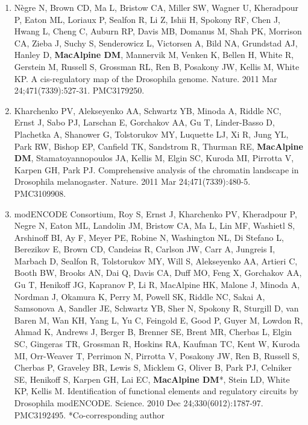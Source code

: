 \documentclass{update_nihbiosketch}
\begin{document}
\begin{enumerate}
\begin{enumerate}
\item Nègre N, Brown CD, Ma L, Bristow CA, Miller SW, Wagner U, Kheradpour P, Eaton ML, Loriaux P, Sealfon R, Li Z, Ishii H, Spokony RF, Chen J, Hwang L, Cheng C, Auburn RP, Davis MB, Domanus M, Shah PK, Morrison CA, Zieba J, Suchy S, Senderowicz L, Victorsen A, Bild NA, Grundstad AJ, Hanley D, \textbf{MacAlpine DM}, Mannervik M, Venken K, Bellen H, White R, Gerstein M, Russell S, Grossman RL, Ren B, Posakony JW, Kellis M, White KP. A cis-regulatory map of the Drosophila genome. Nature. 2011 Mar 24;471(7339):527-31. PMC3179250.

\item Kharchenko PV, Alekseyenko AA, Schwartz YB, Minoda A, Riddle NC, Ernst J, Sabo PJ, Larschan E, Gorchakov AA, Gu T, Linder-Basso D, Plachetka A, Shanower G, Tolstorukov MY, Luquette LJ, Xi R, Jung YL, Park RW, Bishop EP, Canfield TK, Sandstrom R, Thurman RE, \textbf{MacAlpine DM}, Stamatoyannopoulos JA, Kellis M, Elgin SC, Kuroda MI, Pirrotta V, Karpen GH, Park PJ. Comprehensive analysis of the chromatin landscape in Drosophila melanogaster. Nature. 2011 Mar 24;471(7339):480-5. PMC3109908.

\item modENCODE Consortium, Roy S, Ernst J, Kharchenko PV, Kheradpour P, Negre N, Eaton ML, Landolin JM, Bristow CA, Ma L, Lin MF, Washietl S, Arshinoff BI, Ay F, Meyer PE, Robine N, Washington NL, Di Stefano L, Berezikov E, Brown CD, Candeias R, Carlson JW, Carr A, Jungreis I, Marbach D, Sealfon R, Tolstorukov MY, Will S, Alekseyenko AA, Artieri C, Booth BW, Brooks AN, Dai Q, Davis CA, Duff MO, Feng X, Gorchakov AA, Gu T, Henikoff JG, Kapranov P, Li R, MacAlpine HK, Malone J, Minoda A, Nordman J, Okamura K, Perry M, Powell SK, Riddle NC, Sakai A, Samsonova A, Sandler JE, Schwartz YB, Sher N, Spokony R, Sturgill D, van Baren M, Wan KH, Yang L, Yu C, Feingold E, Good P, Guyer M, Lowdon R, Ahmad K, Andrews J, Berger B, Brenner SE, Brent MR, Cherbas L, Elgin SC, Gingeras TR, Grossman R, Hoskins RA, Kaufman TC, Kent W, Kuroda MI, Orr-Weaver T, Perrimon N, Pirrotta V, Posakony JW, Ren B, Russell S, Cherbas P, Graveley BR, Lewis S, Micklem G, Oliver B, Park PJ, Celniker SE, Henikoff S, Karpen GH, Lai EC, \textbf{MacAlpine DM}*, Stein LD, White KP, Kellis M. Identification of functional elements and regulatory circuits by Drosophila modENCODE. Science. 2010 Dec 24;330(6012):1787-97. PMC3192495. *Co-corresponding author

\end{enumerate}


\end{enumerate}
\end{document}
